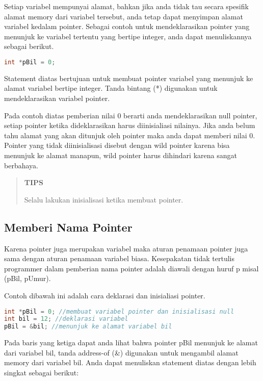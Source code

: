 Setiap variabel mempunyai alamat, bahkan jika anda tidak tau secara
spesifik alamat memory dari variabel tersebut, anda tetap dapat
menyimpan alamat variabel kedalam pointer. Sebagai contoh untuk
mendeklarasikan pointer yang menunjuk ke variabel tertentu yang bertipe
integer, anda dapat menuliskannya sebagai berikut.

\begin{lstlisting}[language=c++, numbers=none]
int *pBil = 0;
\end{lstlisting}

Statement diatas bertujuan untuk membuat pointer variabel yang menunjuk
ke alamat variabel bertipe integer. Tanda bintang (*) digunakan untuk
mendeklarasikan variabel pointer.

Pada contoh diatas pemberian nilai 0 berarti anda mendeklarasikan null
pointer, setiap pointer ketika dideklarasikan harus diinisialiasi
nilainya. Jika anda belum tahu alamat yang akan ditunjuk oleh pointer
maka anda dapat memberi nilai 0. Pointer yang tidak diinisialisasi
disebut dengan wild pointer karena bisa menunjuk ke alamat manapun, wild
pointer harus dihindari karena sangat berbahaya.

\begin{quotation}
	 \textbf{TIPS} 
	 
	 Selalu
	 lakukan inisialisasi ketika membuat pointer.
\end{quotation}


\subsection{Memberi Nama Pointer}\label{memberi-nama-pointer}

Karena pointer juga merupakan variabel maka aturan penamaan pointer juga
sama dengan aturan penamaan variabel biasa. Kesepakatan tidak tertulis
programmer dalam pemberian nama pointer adalah diawali dengan huruf p
misal (pBil, pUmur).

Contoh dibawah ini adalah cara deklarasi dan inisialiasi pointer.

\begin{lstlisting}[language=c++, numbers=none]
int *pBil = 0; //membuat variabel pointer dan inisialisasi null
int bil = 12; //deklarasi variabel
pBil = &bil; //menunjuk ke alamat variabel bil
\end{lstlisting}

Pada baris yang ketiga dapat anda lihat bahwa pointer pBil menunjuk ke
alamat dari variabel bil, tanda address-of (\&) digunakan untuk
mengambil alamat memory dari variabel bil. Anda dapat menuliskan
statement diatas dengan lebih singkat sebagai berikut:

